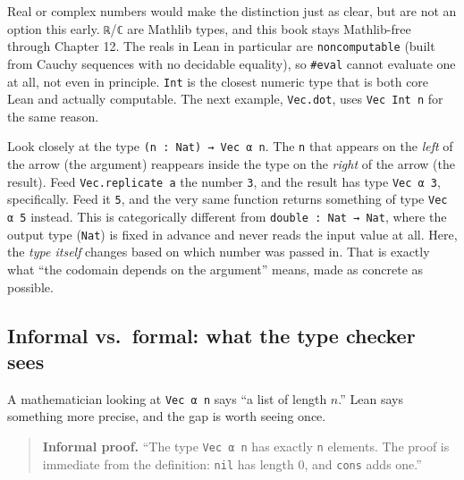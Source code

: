 Real or complex numbers would make the distinction just as clear, but are not an option this early. \texttt{ℝ}/\texttt{ℂ} are Mathlib types, and this book stays Mathlib-free through Chapter 12. The reals in Lean in particular are \texttt{noncomputable} (built from Cauchy sequences with no decidable equality), so \texttt{\#eval} cannot evaluate one at all, not even in principle. \texttt{Int} is the closest numeric type that is both core Lean and actually computable. The next example, \texttt{Vec.dot}, uses \texttt{Vec Int n} for the same reason.

Look closely at the type \texttt{(n : Nat) → Vec α n}. The \texttt{n} that appears on the \emph{left} of the arrow (the argument) reappears inside the type on the \emph{right} of the arrow (the result). Feed \texttt{Vec.replicate a} the number \texttt{3}, and the result has type \texttt{Vec α 3}, specifically. Feed it \texttt{5}, and the very same function returns something of type \texttt{Vec α 5} instead. This is categorically different from \texttt{double : Nat → Nat}, where the output type (\texttt{Nat}) is fixed in advance and never reads the input value at all. Here, the \emph{type itself} changes based on which number was passed in. That is exactly what ``the codomain depends on the argument'' means, made as concrete as possible.

\subsection{Informal vs.~formal: what the type checker sees}\label{sec:01-basics:03-dependent-types:5}

A mathematician looking at \texttt{Vec α n} says ``a list of length \(n\).'' Lean says something more precise, and the gap is worth seeing once.

\begin{quote}
\textbf{Informal proof.} ``The type \texttt{Vec α n} has exactly \texttt{n} elements. The proof is immediate from the definition: \texttt{nil} has length 0, and \texttt{cons} adds one.''
\end{quote}

